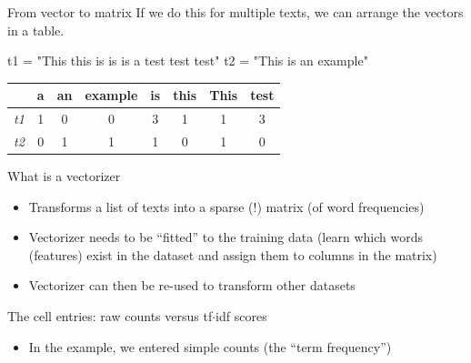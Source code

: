 \documentclass[handout]{beamer}
\begin{document}
\begin{frame}{From vector to matrix}
	If we do this for multiple texts, we can arrange the vectors in a table.
	
	t1 = "This this is is is a test test test" \newline
	t2 = "This is an example"
	
	\begin{tabular}{| c|c|c|c|c|c|c|c|}
		\hline
		& a & an & example & is & this & This & test \\
		\hline
		\emph{t1} & 1 & 0 & 0 & 3 & 1 & 1 & 3 \\
		\emph{t2} &0 & 1 & 1 & 1 & 0 & 1 & 0 \\
		\hline
	\end{tabular}
\end{frame}


\begin{frame}{What is a vectorizer}
	\begin{itemize}[<+->]
		\item Transforms a list of texts into a sparse (!) matrix (of word frequencies)
		\item Vectorizer needs to be ``fitted'' to the training data (learn which words (features) exist in the dataset and assign them to columns in the matrix)
		\item Vectorizer can then be re-used to transform other datasets 
	\end{itemize}
\end{frame}


\begin{frame}{The cell entries: raw counts versus tf$\cdot$idf scores}
	\begin{itemize}
		\item In the example, we entered simple counts (the ``term frequency'')
	\end{itemize}
\end{frame}

\end{document}
